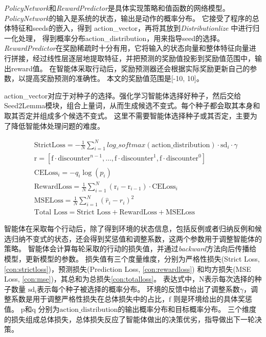 \textit{PolicyNetwork}和\textit{RewardPredictor}是具体实现策略和值函数的网络模型。
\textit{PolicyNetwork}的输入是系统的状态，输出是动作的概率分布。
它接受了程序的总体特征和seeds的嵌入，得到 action\_vector，再将其放到\textit{Distributionlize} 中进行归一化处理，
得到概率分布action\_distribution，用来指导seed的选择。
\textit{RewardPredictor}在奖励稀疏时十分有用，它将输入的状态向量和整体特征向量进行拼接，经过线性层逐层地提取特征，并把预测的奖励值投影到奖励值范围中，输出reward值。
在智能体采取行动后，奖励预测器还会根据实际奖励更新自己的参数，以提高奖励预测的准确性。
本文的奖励值范围是[-10, 10]。

action\_vector对应于对种子的选择。强化学习智能体选择好种子，然后交给Seed2Lemma模块，组合上量词，从而生成候选不变式。每个种子都会取其本身和取其否定并组成多个候选不变式。
这里不需要智能体选择种子或其否定，主要为了降低智能体处理问题的难度。

\begin{align}
	&\text{StrictLoss} = - \frac{1}{N} \sum_{i=1}^{N} log\_softmax(\text{action\_distribution}) \cdot \text{sd}_i \cdot \gamma \label{con:strictloss} \\
	&\text{r} = \left[ \text{f} \cdot \text{discounter}^{n-1}, \ldots , \text{f} \cdot \text{discounter}^1, \text{f} \cdot \text{discounter}^{0} \right] \label{con:r}\\
	&\text{CELoss}_i = -q_{i} \log(p_{i}) \label{con:celoss} \\
	&\text{RewardLoss} = \frac{1}{N} \sum_{i=1}^{N} (\text{r}_{i} - \text{r}_{i-1}) \cdot \text{CELoss}_i \label{con:rewardloss} \\
	&\text{MSELoss} = \frac{1}{N} \sum_{i=1}^{N} (\hat{r}_i - r_i)^2\label{con:mse} \\
	&\text{Total Loss} = \text{Strict Loss}+\text{RewardLoss}+\text{MSELoss} \label{con:totalloss}
\end{align}

智能体在采取每个行动后，除了得到环境的状态信息，包括反例或者归纳反例和候选归纳不变式的状态，还会得到奖惩值和调整系数，这两个参数用于调整智能体的策略。
智能体会计算每轮采取的行动的损失值，并通过\textit{backward}方法向后传播给模型，更新模型的参数。
损失值有三个度量维度，分别为严格性损失(Strict Loss, \ref{con:strictloss})，预测损失(Prediction Loss, \ref{con:rewardloss})
和均方损失(MSE Loss, \ref{con:mse})，其总和为总损失\ref{con:totalloss}。
表达式中，$\text{N}$表示每次选择的种子数量 $\text{sd}_i$表示每个种子被选择的概率分布。
环境的反馈中给出了调整系数$\gamma$，调整系数是用于调整严格性损失在总体损失中的占比，$\text{f}$ 则是环境给出的具体奖惩值。
$\text{p}$和$\text{q}$ 分别为$\text{action\_distribution}$的输出概率分布和目标概率分布。
三个维度的损失组成总体损失，总体损失反应了智能体做出的决策优劣，指导做出下一轮决策。


